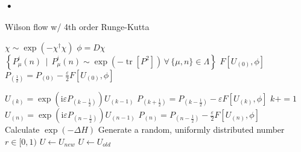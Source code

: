 \documentclass[a4paper,10pt]{article}
\begin{document}
\subsubsection{•}
\begin{algorithm}[H]
\caption{Wilson flow w/ 4th order Runge-Kutta}\label{alg:Wilson_flow}
\begin{algorithmic}

\Ensure 
\State $\chi \sim \exp\left(- \chi^{\dagger} \chi  \right)$
\State $\phi = D\chi$
\State $\left\{P_{\mu}^{i}(n)\, \mid \, P_{\mu}^{i}(n)\sim \exp \left(-\operatorname{tr}\left[P^{2}\right]\right)\,\forall\,\{\mu,n\}\in \Lambda \right\}$
\State $F\left[ U_{(0)},\phi \right]$
\State $P_{\left(\frac{1}{2}\right)}=P_{(0)}-\frac{\varepsilon}{2}F\left[ U_{(0)},\phi \right]$

\State $U_{(k)}=\exp \left(\mathrm{i} \varepsilon P_{\left(k-\frac{1}{2}\right)}\right) U_{(k-1)}$
\State $P_{\left(k+\frac{1}{2}\right)}=P_{\left(k-\frac{1}{2}\right)}-\varepsilon F\left[ U_{(k)},\phi \right]$
\State $ k+=1$
\EndWhile
\State $U_{(n)}=\exp \left(\mathrm{i} \varepsilon P_{\left(n-\frac{1}{2}\right)}\right) U_{(n-1)}$
\State $P_{\left(n\right)}=P_{\left(n-\frac{1}{2}\right)}-\frac{\varepsilon}{2} F\left[ U_{(n)},\phi \right]$\\
\State Calculate $\exp (-\Delta H)$
\State Generate a random, uniformly distributed number $r \in [0,1) $
    \State $U \gets U_{new}$
\Else
    \State $U \gets U_{old}$
\EndIf

\end{algorithmic}
\end{algorithm}
\end{document}

